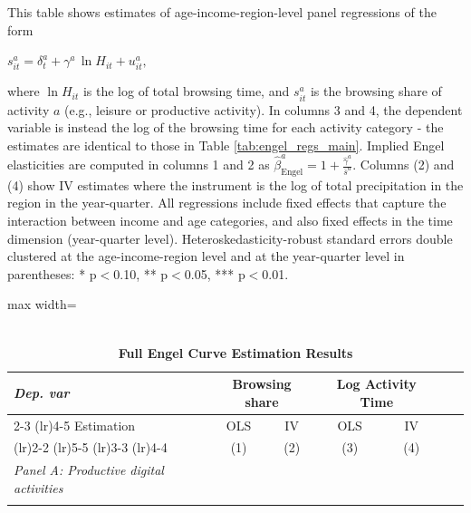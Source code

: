 \documentclass[12pt]{article}
\begin{document}





\clearpage



\begin{table}[htbp]
\caption{\\ \centering \textbf{Full Engel Curve Estimation Results}}  


\vspace{-0.1cm}  \footnotesize  This table shows estimates of age-income-region-level panel regressions of the form
\begin{center}$
s_{it}^{a}
=
\delta_{t}^{a}
+
\gamma^{a}\,\ln H_{it}
+
u_{it}^{a},
$
\end{center}
where $\ln H_{it}$ is the log of total browsing time, and $s_{it}^{a}$ is the browsing share of activity $a$ (e.g., leisure or productive activity). In columns 3 and 4, the dependent variable is instead the log of the browsing time for each activity category - the estimates are identical to those in Table \ref{tab:engel_regs_main}. Implied Engel elasticities are computed in columns 1 and 2 as $\hat{\beta}^a_{\text{Engel}} = 1+ \frac{\hat{\gamma}^a}{\bar{s}^a}$. Columns (2) and (4) show IV estimates where the instrument is the log of total precipitation in the region in the year-quarter.
All regressions include fixed effects that capture the interaction between income and age categories, and also fixed effects in the time dimension (year-quarter level). Heteroskedasticity-robust standard errors double clustered at the age-income-region level and at the year-quarter level in parentheses: * p$<$0.10, ** p$<$0.05, *** p$<$0.01. \label{tab:engel_regs}  \vspace{.2cm}
 
 \centering
\begin{adjustbox}{max width=\textwidth}
\begin{tabular}{@{}l*{6}{c}@{}}
\toprule
\textit{Dep. var} & \multicolumn{2}{c}{Browsing share} &  \multicolumn{2}{c}{Log Activity Time} \\
   \cmidrule(lr){2-3} \cmidrule(lr){4-5}
   \addlinespace
   	Estimation & OLS & IV & OLS & IV \\ 
      \addlinespace
      \cmidrule(lr){2-2} \cmidrule(lr){5-5}  \cmidrule(lr){3-3} \cmidrule(lr){4-4}
                                        &\multicolumn{1}{c}{(1)}   &\multicolumn{1}{c}{(2)}   &\multicolumn{1}{c}{(3)}   &\multicolumn{1}{c}{(4)}     \\ 
                   \midrule
\emph{Panel A: Productive digital activities}  &&&& \\
\addlinespace
                   

\end{tabular}
\end{adjustbox}
\end{table}
\end{document}
